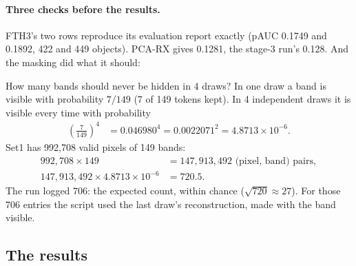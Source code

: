 \paragraph{Three checks before the results.} FTH3's two rows reproduce its evaluation report exactly (pAUC 0.1749 and
0.1892, 422 and 449 objects)\tbrk{}.
PCA-RX gives 0.1281, the stage-3 run's 0.128\tbrk{}. And the masking did what it should:

\begin{worked}[label={we:hsldetect:never}]{How many bands should never be hidden in 4 draws?}
In one draw a band is visible with probability $7/149$ (7 of 149 tokens kept). In 4 independent draws it is visible
every time with probability
\begin{align*}
\left(\frac{7}{149}\right)^4 &= 0.046980^4 = 0.0022071^2 = 4.8713\times10^{-6}.
\end{align*}
Set1 has 992,708 valid pixels of 149 bands:
\begin{align*}
992{,}708\times149 &= 147{,}913{,}492 \text{ (pixel, band) pairs},\\
147{,}913{,}492\times4.8713\times10^{-6} &= 720.5 .
\end{align*}
The run logged 706: the expected count, within chance
($\sqrt{720}\approx27$)\tagC. For those 706 entries the script used the last draw's reconstruction, made with the band
visible.
\end{worked}

\subsection{The results}

